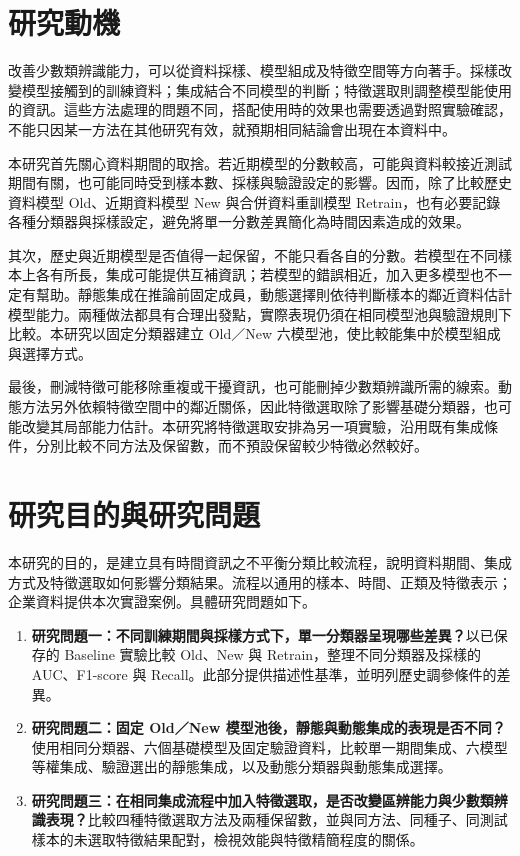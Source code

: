 \section{研究動機}

改善少數類辨識能力，可以從資料採樣、模型組成及特徵空間等方向著手。採樣改變模型接觸到的訓練資料；集成結合不同模型的判斷；特徵選取則調整模型能使用的資訊。這些方法處理的問題不同，搭配使用時的效果也需要透過對照實驗確認，不能只因某一方法在其他研究有效，就預期相同結論會出現在本資料中。

本研究首先關心資料期間的取捨。若近期模型的分數較高，可能與資料較接近測試期間有關，也可能同時受到樣本數、採樣與驗證設定的影響。因而，除了比較歷史資料模型 Old、近期資料模型 New 與合併資料重訓模型 Retrain，也有必要記錄各種分類器與採樣設定，避免將單一分數差異簡化為時間因素造成的效果。

其次，歷史與近期模型是否值得一起保留，不能只看各自的分數。若模型在不同樣本上各有所長，集成可能提供互補資訊；若模型的錯誤相近，加入更多模型也不一定有幫助。靜態集成在推論前固定成員，動態選擇則依待判斷樣本的鄰近資料估計模型能力。兩種做法都具有合理出發點，實際表現仍須在相同模型池與驗證規則下比較。本研究以固定分類器建立 Old／New 六模型池，使比較能集中於模型組成與選擇方式。

最後，刪減特徵可能移除重複或干擾資訊，也可能刪掉少數類辨識所需的線索。動態方法另外依賴特徵空間中的鄰近關係，因此特徵選取除了影響基礎分類器，也可能改變其局部能力估計。本研究將特徵選取安排為另一項實驗，沿用既有集成條件，分別比較不同方法及保留數，而不預設保留較少特徵必然較好。

\section{研究目的與研究問題}

本研究的目的，是建立具有時間資訊之不平衡分類比較流程，說明資料期間、集成方式及特徵選取如何影響分類結果。流程以通用的樣本、時間、正類及特徵表示；企業資料提供本次實證案例。具體研究問題如下。

\begin{enumerate}
\item \textbf{研究問題一：不同訓練期間與採樣方式下，單一分類器呈現哪些差異？}以已保存的 Baseline 實驗比較 Old、New 與 Retrain，整理不同分類器及採樣的 AUC、F1-score 與 Recall。此部分提供描述性基準，並明列歷史調參條件的差異。
\item \textbf{研究問題二：固定 Old／New 模型池後，靜態與動態集成的表現是否不同？}使用相同分類器、六個基礎模型及固定驗證資料，比較單一期間集成、六模型等權集成、驗證選出的靜態集成，以及動態分類器與動態集成選擇。
\item \textbf{研究問題三：在相同集成流程中加入特徵選取，是否改變區辨能力與少數類辨識表現？}比較四種特徵選取方法及兩種保留數，並與同方法、同種子、同測試樣本的未選取特徵結果配對，檢視效能與特徵精簡程度的關係。
\end{enumerate}

